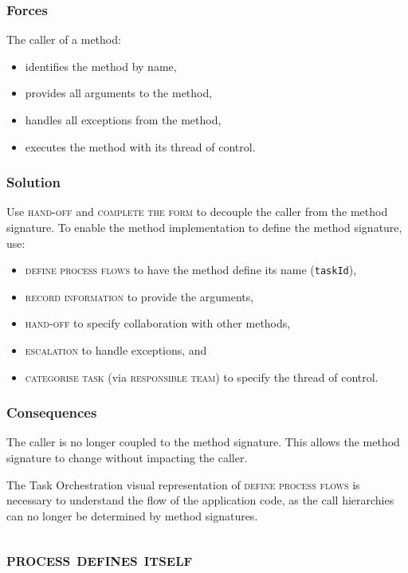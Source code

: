 \documentclass[prodmode]{style/acmlarge}
\begin{document}
\subsubsection*{Forces} The caller of a method:
\begin{itemize}
  \item identifies the method by name,
  \item provides all arguments to the method,
  \item handles all exceptions from the method,
  \item executes the method with its thread of control.
\end{itemize}

\subsubsection*{\textbf{Solution}} Use \textsc{hand-off} and \textsc{complete the form}
to decouple the caller from the method signature.  To enable the method
implementation to define the method signature, use:
\begin{itemize}
  \item \textsc{define process flows} to have the method define its name (\texttt{taskId}),
  \item \textsc{record information} to provide the arguments,
  \item \textsc{hand-off} to specify collaboration with other methods,
  \item \textsc{escalation} to handle exceptions, and
  \item \textsc{categorise task} (via \textsc{responsible team}) to specify the thread of control.    
\end{itemize}

\subsubsection*{Consequences} The caller is no longer coupled to the method
signature.  This allows the method signature to change without impacting the
caller.

The Task Orchestration visual representation of \textsc{define process flows} is
necessary to understand the flow of the application code, as the call
hierarchies can no longer be determined by method signatures.



\subsection{\textsc{\textbf{process defines itself}}}
\end{document}
